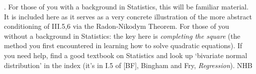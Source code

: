 \documentclass[12pt]{article}
\begin{document}
.  For those of you with a background in Statistics, this will be familiar
material.  It is included here as it serves as a very concrete illustration of the more abstract
conditioning of III.5,6 via the Radon-Nikodym Theorem.  For those of you without a background in
Statistics: the key here is {\it completing the
square} (the method you first encountered in learning how to solve quadratic equations).  If
you need help, find a good textbook on Statistics and look up `bivariate normal distribution'
in the index (it's in I.5 of [BF], Bingham and Fry, {\sl Regression}). \hfil NHB \break
\end{document}
